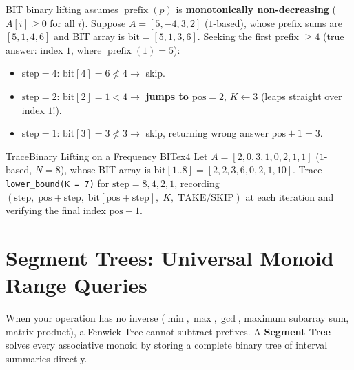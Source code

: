 \documentclass[11pt,a4paper]{article}
\theoremstyle{definition}
\begin{document}
\begin{watchoutbox}
BIT binary lifting assumes $\operatorname{prefix}(p)$ is \textbf{monotonically non-decreasing} ($A[i] \ge 0$ for all $i$). Suppose $A = [5, -4, 3, 2]$ ($1$-based), whose prefix sums are $[5, 1, 4, 6]$ and BIT array is $\text{bit} = [5, 1, 3, 6]$. Seeking the first prefix $\ge 4$ (true answer: index $1$, where $\operatorname{prefix}(1) = 5$):
\begin{itemize}[itemsep=1pt, topsep=1pt]
    \item $\text{step} = 4$: $\text{bit}[4] = 6 \not< 4 \to$ skip.
    \item $\text{step} = 2$: $\text{bit}[2] = 1 < 4 \to$ \textbf{jumps to $\text{pos} = 2$}, $K \leftarrow 3$ (leaps straight over index $1$!).
    \item $\text{step} = 1$: $\text{bit}[3] = 3 \not< 3 \to$ skip, returning wrong answer $\text{pos} + 1 = 3$.
\end{itemize}
\end{watchoutbox}

\begin{tryitbox}{Trace}{Binary Lifting on a Frequency BIT}{ex4}
Let $A = [2, 0, 3, 1, 0, 2, 1, 1]$ ($1$-based, $N = 8$), whose BIT array is $\text{bit}[1..8] = [2, 2, 3, 6, 0, 2, 1, 10]$. Trace \texttt{lower\_bound(K = 7)} for $\text{step} = 8, 4, 2, 1$, recording $(\text{step},\; \text{pos} + \text{step},\; \text{bit}[\text{pos}+\text{step}],\; K,\; \text{TAKE/SKIP})$ at each iteration and verifying the final index $\text{pos} + 1$.
\end{tryitbox}

\section{Segment Trees: Universal Monoid Range Queries}

When your operation has no inverse ($\min, \max, \gcd$, maximum subarray sum, matrix product), a Fenwick Tree cannot subtract prefixes. A \textbf{Segment Tree} solves every associative monoid by storing a complete binary tree of interval summaries directly.
\end{document}
